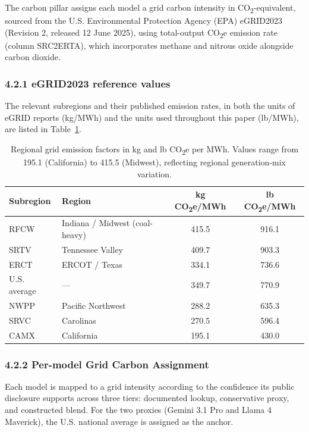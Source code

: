 \documentclass[11pt]{article}
\newcommand{\cotwo}{CO\textsubscript{2}}     %
\begin{document}
The carbon pillar assigns each model a grid carbon intensity in \cotwo-equivalent, sourced from the U.S. Environmental Protection Agency (EPA) eGRID2023 (Revision 2, released 12 June 2025), using total-output \cotwo e emission rate (column SRC2ERTA), which incorporates methane and nitrous oxide alongside carbon dioxide.

\subsubsection*{4.2.1 eGRID2023 reference values}

The relevant subregions and their published emission rates, in both the units of eGRID reports (kg/MWh) and the units used throughout this paper (lb/MWh), are listed in Table~\ref{tab:egrid-ref}.

\begin{table}[htbp]
  \centering
  \begin{tabular}{@{}l l c c@{}}
    \toprule
    \textbf{Subregion} & \textbf{Region} & \textbf{kg \cotwo e/MWh} & \textbf{lb \cotwo e/MWh} \\
    \midrule
    RFCW         & Indiana / Midwest (coal-heavy) & 415.5 & 916.1 \\
    SRTV         & Tennessee Valley               & 409.7 & 903.3 \\
    ERCT         & ERCOT / Texas                  & 334.1 & 736.6 \\
    U.S. average & ---                            & 349.7 & 770.9 \\
    NWPP         & Pacific Northwest              & 288.2 & 635.3 \\
    SRVC         & Carolinas                      & 270.5 & 596.4 \\
    CAMX         & California                     & 195.1 & 430.0 \\
    \bottomrule
  \end{tabular}
  \caption{Regional grid emission factors in kg and lb \cotwo e per MWh. Values range from 195.1 (California) to 415.5 (Midwest), reflecting regional generation-mix variation.}
  \label{tab:egrid-ref}
\end{table}

\subsubsection*{4.2.2 Per-model Grid Carbon Assignment}

Each model is mapped to a grid intensity according to the confidence its public disclosure supports across three tiers: documented lookup, conservative proxy, and constructed blend. For the two proxies (Gemini 3.1 Pro and Llama 4 Maverick), the U.S. national average is assigned as the anchor.
\end{document}
